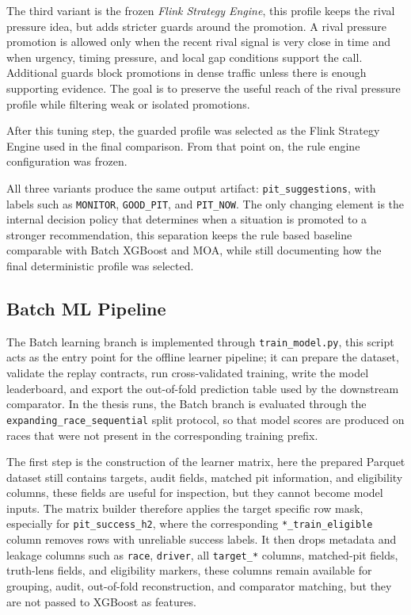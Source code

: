 The third variant is the frozen \textit{Flink Strategy Engine}, this profile keeps the rival pressure idea, but adds stricter guards around the promotion. A rival pressure 
promotion is allowed only when the recent rival signal is very close in time and when urgency, timing pressure, and local gap conditions support the call. Additional guards 
block promotions in dense traffic unless there is enough supporting evidence. The goal is to preserve the useful reach of the rival pressure profile while filtering weak or 
isolated promotions.

After this tuning step, the guarded profile was selected as the Flink Strategy Engine used in the final comparison. From that point on, the rule engine configuration was 
frozen.

All three variants produce the same output artifact: \texttt{pit\_suggestions}, with labels such as \texttt{MONITOR}, \texttt{GOOD\_PIT}, and \texttt{PIT\_NOW}. The only changing 
element is the internal decision policy that determines when a situation is promoted to a stronger recommendation, this separation keeps the rule based baseline comparable with 
Batch XGBoost and MOA, while still documenting how the final deterministic profile was selected.



\subsection{Batch ML Pipeline}

The Batch learning branch is implemented through \texttt{train\_model.py}, this script acts as the entry point for the offline learner pipeline;
it can prepare the dataset, validate the replay contracts, run cross-validated training, write the model leaderboard, and export the out-of-fold prediction table used
by the downstream comparator. In the thesis runs, the Batch branch is evaluated through the \texttt{expanding\_race\_sequential} split protocol, so that model scores are
produced on races that were not present in the corresponding training prefix.

The first step is the construction of the learner matrix, here the prepared Parquet dataset still contains targets, audit fields, matched pit information, and eligibility columns,
these fields are useful for inspection, but they cannot become model inputs. The matrix builder therefore applies the target specific row mask, especially for \texttt{pit\_success\_h2},
where the corresponding \texttt{*\_train\_eligible} column removes rows with unreliable success labels. It then drops metadata and leakage columns such as \texttt{race}, \texttt{driver},
all \texttt{target\_*} columns, matched-pit fields, truth-lens fields, and eligibility markers, these columns remain available for grouping, audit, out-of-fold
reconstruction, and comparator matching, but they are not passed to XGBoost as features.

